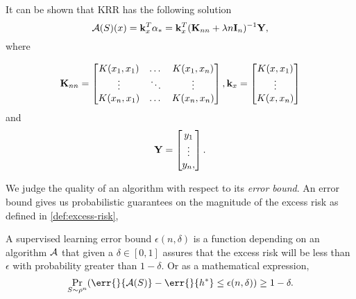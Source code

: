 It can be shown that KRR has the following solution
\begin{equation}
\label{eq:krr-equation} \mathcal{A}(S)(x) = \mathbf{k}_{x}^{T} \mathbf{\alpha}_{\ast} =
\mathbf{k}_{x}^{T} (\mathbf{K}_{nn} + \lambda n \mathbf{I}_{n})^{-1}\mathbf{Y},
\end{equation}
where

\begin{equation*}
  \mathbf{K}_{nn} =
  \begin{bmatrix}
    K(x_{1}, x_{1}) & \dots & K(x_{1}, x_{n}) \\
    \vdots & \ddots & \vdots \\
    K(x_{n}, x_{1}) & \dots & K(x_{n}, x_{n})
  \end{bmatrix}
  , \mathbf{k}_{x} =
  \begin{bmatrix}
    K(x, x_{1}) \\ \vdots \\ K(x, x_{n})
  \end{bmatrix}
\end{equation*} and
\begin{equation*}
  \mathbf{Y} =
  \begin{bmatrix}
    y_1 \\ \vdots \\ y_n, 
  \end{bmatrix}
  .
\end{equation*}

We judge the quality of an algorithm with respect to its \emph{error bound}. An
error bound gives us probabilistic guarantees on the magnitude of the excess
risk as defined in \ref{def:excess-risk},
\begin{definition}
  \label{def:error-bound-sl} A supervised learning error bound \(\epsilon(n,
\delta)\) is a function depending on an algorithm \(\mathcal{A}\) that given a
\(\delta \in [0, 1]\) assures that the excess risk will be less than
\(\epsilon\) with probability greater than \(1 - \delta\). Or as a mathematical
expression,
  \begin{equation*} \Pr_{S \sim \rho^n}(\err{}{\algo(S)} - \err{}{h^{\ast}} \leq
\epsilon(n, \delta)) \geq 1 - \delta.
  \end{equation*}
\end{definition}

